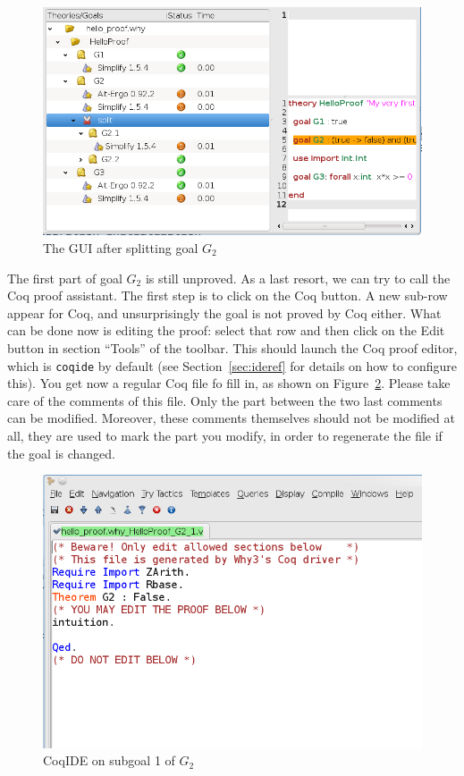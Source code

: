 \begin{figure}[tbp]
  \includegraphics[width=\textwidth]{gui4.png}
  \caption{The GUI after splitting goal $G_2$}
  \label{fig:gui4}
\end{figure}

The first part of goal $G_2$ is still unproved. As a last resort, we
can try to call the Coq proof assistant. The first step is to click on
the \textsf{Coq} button. A new sub-row appear for Coq, and
unsurprisingly the goal is not proved by Coq either. What can be done
now is editing the proof: select that row and then click on the
\textsf{Edit} button in section ``Tools'' of the toolbar. This should
launch the Coq proof editor, which is \texttt{coqide} by default (see
Section~\ref{sec:ideref} for details on how to configure this). You get
now a regular Coq file fo fill in, as shown on Figure~\ref{fig:coqide}.
Please take care of the comments of this file. Only the part between
the two last comments can be modified. Moreover, these comments
themselves should not be modified at all, they are used to mark the
part you modify, in order to regenerate the file if the goal is
changed.

\begin{figure}[tbp]
  \includegraphics[width=\textwidth]{coqide.png}
  \caption{CoqIDE on subgoal 1 of $G_2$}
  \label{fig:coqide}
\end{figure}


